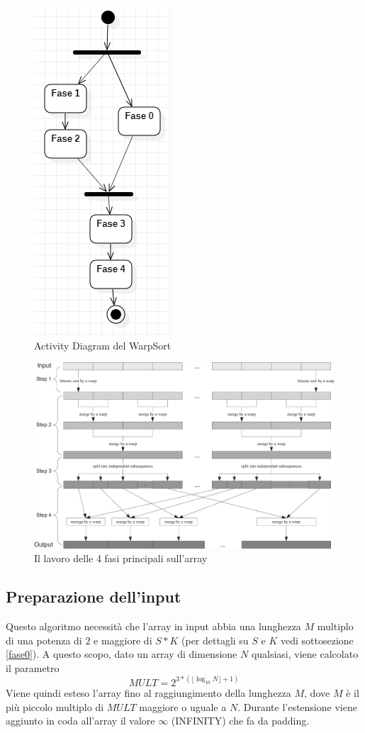 \documentclass[a4paper, 11pt]{article}
\begin{document}
		\begin{figure}
			\centering
			\includegraphics[width=0.3\linewidth]{img/ActivityDiagram}
			\caption{Activity Diagram del WarpSort}
			\label{fig:activitydiagram}
		\end{figure}		
		\begin{figure}
			\centering
			\includegraphics[width=0.9\linewidth]{img/fasiPrincipali}
			\caption{Il lavoro delle 4 fasi principali sull'array}
			\label{fig:fasiprincipali}
		\end{figure}
		
		\subsection{Preparazione dell'input}
			\label{preInput}
			Questo algoritmo necessità che l'array in input abbia una lunghezza $M$ multiplo di una potenza di $2$ e maggiore di $S*K$ (per 
			dettagli su $S$ e $K$ vedi sottosezione \ref{fase0}).
			A questo scopo, dato un array di dimensione $N$ qualsiasi, viene calcolato il parametro 
			$$MULT = 2^{3 * (\lfloor \log_{10} N\rfloor + 1)}$$ 
			Viene quindi esteso l'array fino al raggiungimento della lunghezza $M$, dove $M$ è il più piccolo multiplo di $MULT$ maggiore
			o uguale a $N$.
			Durante l'estensione viene aggiunto in coda all'array il valore $\infty$ (INFINITY) che fa da padding.
		
\end{document}

